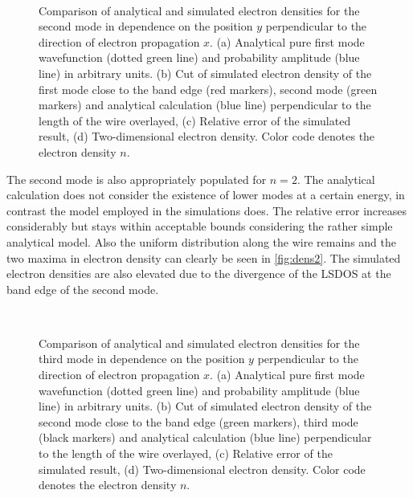 \begin{figure}[h]
  \begin{center}
 \qquad
    \\
    \qquad
    \caption{Comparison of analytical and simulated electron densities for the second mode in dependence on the position $y$ perpendicular to the direction of electron propagation $x$. (a) Analytical pure first mode wavefunction (dotted green line) and probability amplitude (blue line) in arbitrary units. (b) Cut of simulated electron density of the first mode close to the band edge (red markers), second mode (green markers) and analytical calculation (blue line) perpendicular to the length of the wire overlayed, (c) Relative error of the simulated result, (d) Two-dimensional electron density. Color code denotes the electron density $n$.}\label{fig:mode2}
  \end{center}
\end{figure}
The second mode is also appropriately populated for $n=2$. The analytical calculation does not consider the existence of lower modes at a certain energy, in contrast the model employed in the simulations does. The relative error increases considerably but stays within acceptable bounds considering the rather simple analytical model.
Also the uniform distribution along the wire remains and the two maxima in electron density can clearly be seen in \cref{fig:dens2}. The simulated electron densities are also elevated due to the divergence of the LSDOS at the band edge of the second mode.\par
\begin{figure}[h]
  \begin{center}
 \qquad
    \\
    \qquad
    \caption{Comparison of analytical and simulated electron densities for the third mode in dependence on the position $y$ perpendicular to the direction of electron propagation $x$. (a) Analytical pure first mode wavefunction (dotted green line) and probability amplitude (blue line) in arbitrary units. (b) Cut of simulated electron density of the second mode close to the band edge (green markers), third mode (black markers) and analytical calculation (blue line) perpendicular to the length of the wire overlayed, (c) Relative error of the simulated result, (d) Two-dimensional electron density. Color code denotes the electron density $n$.}\label{fig:mode3}
  \end{center}
\end{figure}
